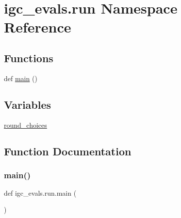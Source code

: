 \hypertarget{namespaceigc__evals_1_1run}{}\section{igc\+\_\+evals.\+run Namespace Reference}
\label{namespaceigc__evals_1_1run}
\subsection*{Functions}
\begin{DoxyCompactItemize}
\item 
def \hyperlink{namespaceigc__evals_1_1run_ac45cf85723a667c904378dacaee81ed7}{main} ()
\end{DoxyCompactItemize}
\subsection*{Variables}
\begin{DoxyCompactItemize}
\item 
\hyperlink{namespaceigc__evals_1_1run_a8d800bb89949fff41662851f88503919}{round\+\_\+choices}
\end{DoxyCompactItemize}


\subsection{Function Documentation}
\mbox{\label{namespaceigc__evals_1_1run_ac45cf85723a667c904378dacaee81ed7}} 
\subsubsection{\texorpdfstring{main()}{main()}}
{\footnotesize\ttfamily def igc\+\_\+evals.\+run.\+main (\begin{DoxyParamCaption}{ }\end{DoxyParamCaption})}

